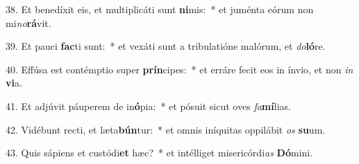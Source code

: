 38. Et benedíxit eis, et multiplicáti sunt \textbf{ni}mis:~*  et juménta eórum non mi\textit{no}\textbf{rá}vit.\

39. Et pauci \textbf{fac}ti sunt:~*  et vexáti sunt a tribulatióne malórum, et \textit{do}\textbf{ló}re.\

40. Effúsa est contémptio super \textbf{prín}cipes:~*  et erráre fecit eos in ínvio, et non \textit{in} \textbf{vi}a.\

41. Et adjúvit páuperem de in\textbf{ó}pia:~*  et pósuit sicut oves \textit{fa}\textbf{mí}lias.\

42. Vidébunt recti, et læta\textbf{bún}tur:~*  et omnis iníquitas oppilábit \textit{os} \textbf{su}um.\

43. Quis sápiens et custódi\textbf{et} hæc?~*  et intélliget misericórdi\textit{as} \textbf{Dó}mini.\

